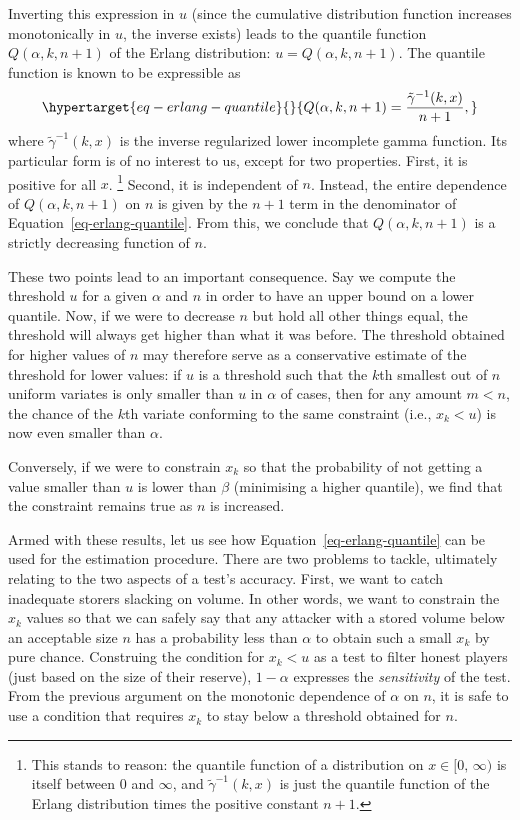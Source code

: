 Inverting this expression in $u$ (since the cumulative distribution
function increases monotonically in $u$, the inverse exists) leads to
the quantile function $Q(\alpha,k,n+1)$ of the Erlang distribution:
$u = Q(\alpha,k,n+1)$.
The quantile function is known to be expressible as
\begin{equation}\protect\hypertarget{eq-erlang-quantile}{}{
Q(\alpha,k,n+1)
= \frac{\tilde{\gamma}^{-1}(k,x)}{n+1} ,
}\label{eq-erlang-quantile}\end{equation} where
$\tilde{\gamma}^{-1}(k,x)$ is the inverse regularized lower incomplete
gamma function. Its particular form is of no interest to us, except for
two properties. First, it is positive for all $x$.%
%
\footnote{This stands to
reason: the quantile function of a distribution on
$x \in [0, \, \infty)$ is itself between 0 and $\infty$, and
$\tilde{\gamma}^{-1}(k,x)$ is just the quantile function of the Erlang
distribution times the positive constant $n+1$.}
%
Second, it is
independent of $n$. Instead, the entire dependence of
$Q(\alpha,k,n+1)$ on $n$ is given by the $n+1$ term in the
denominator of Equation~\ref{eq-erlang-quantile}. From this, we conclude
that $Q(\alpha,k,n+1)$ is a strictly decreasing function of $n$.

These two points lead to an important consequence. Say we compute the
threshold $u$ for a given $\alpha$ and $n$ in order to have an upper bound on a lower quantile. Now, if we were to
decrease $n$ but hold all other things equal, the threshold will
always get higher than what it was before. The threshold obtained for
higher values of $n$ may therefore serve as a conservative estimate of
the threshold for lower values: if $u$ is a threshold such that the
$k$th smallest out of $n$ uniform variates is only smaller than $u$ in
$\alpha$ of cases, then for any amount $m<n$, the chance of the
$k$th variate conforming to the same constraint (i.e., $x_k<u$) is now even smaller than $\alpha$. 

Conversely, if we were to constrain $x_k$ so that the probability of not getting a value smaller than $u$ is lower than $\beta$ (minimising a higher quantile), we find that the constraint remains true as $n$ is increased.

Armed with these results, let us see how
Equation~\ref{eq-erlang-quantile} can be used for the estimation
procedure.  
There are two problems to tackle, ultimately relating to the two aspects of a test's accuracy. First, we want to catch inadequate storers slacking on volume. In other words, we want to constrain the $x_k$ values so that we can safely say that any attacker with a stored volume below an acceptable size $n$ has a probability less than $\alpha$ to obtain such a small $x_k$ by pure chance. Construing the condition for $x_k<u$ as a test to filter honest players (just based on the size of their reserve), $1-\alpha$ expresses the \emph{sensitivity} of the test.
From the previous argument on the monotonic dependence of $\alpha$ on $n$, it is safe to use a condition that requires $x_k$ to stay below a threshold obtained for $n$. 

